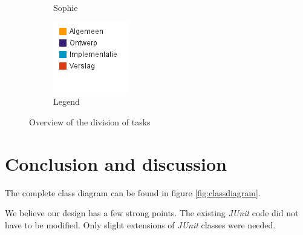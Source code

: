 \documentclass[i2]{oss}
\newcommand{\junit}{\emph{JUnit }}
\begin{document}
\begin{figure}[h!]
\begin{subfigure}[hb]{0.20\textwidth}
                \caption{Sophie}
        \end{subfigure}%
                \begin{subfigure}[hb]{0.20\textwidth}
                \centering
                \includegraphics[width=\textwidth]{legende}
                \caption{Legend}
        \end{subfigure}%


 \caption{Overview of the division of tasks}
\label{fig:werkverdeling}
\end{figure}





\section{Conclusion and discussion}
\label{ssec:conclusion}

The complete class diagram can be found in figure \ref{fig:classdiagram}.


We believe our design has a few strong points.
The existing \junit code did not have to be modified.
Only slight extensions of \junit classes were needed.
\end{document}
